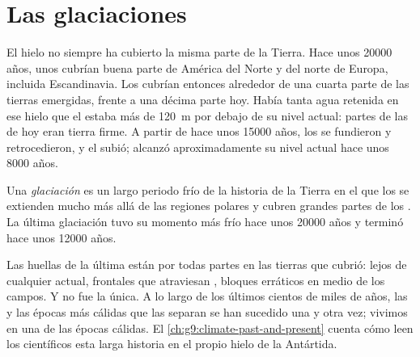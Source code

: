 \section{Las glaciaciones}

El hielo no siempre ha cubierto la misma parte de la Tierra. Hace unos
\num{20000} años, unos  cubrían buena parte de América
del Norte y del norte de Europa, incluida Escandinavia. Los 
cubrían entonces alrededor de una cuarta parte de las tierras emergidas,
frente a una décima parte hoy. Había tanta agua retenida en ese hielo que
el  estaba más de \qty{120}{m} por debajo de su nivel actual: partes de
las  de hoy eran tierra firme. A partir de hace
unos \num{15000} años, los  se fundieron y retrocedieron, y el 
subió; alcanzó aproximadamente su nivel actual hace unos \num{8000} años.

\begin{definition}[Glaciación]\label{def:g8:ice-on-earth:ice-age}
Una \emph{glaciación} es un largo periodo
frío de la historia de la Tierra en el que los  se
extienden mucho más allá de las regiones polares y cubren grandes partes de
los . La última glaciación tuvo su momento más frío hace unos
\num{20000} años y terminó hace unos \num{12000} años.
\end{definition}

Las huellas de la última  están por todas partes en las tierras
que cubrió:  lejos de cualquier  actual, 
frontales que atraviesan , bloques erráticos en medio de los
campos. Y no fue la única. A lo largo de los últimos cientos de miles de
años, las  y las épocas más cálidas que las separan se han
sucedido una y otra vez; vivimos en una de las épocas cálidas. El
\cref{ch:g9:climate-past-and-present} cuenta cómo leen los científicos esta
larga historia en el propio hielo de la Antártida.

